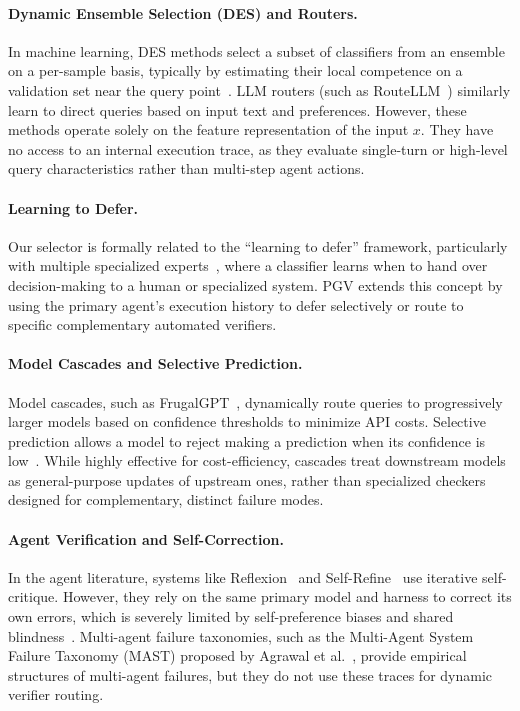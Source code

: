 \documentclass[manuscript,screen,nonacm]{acmart}
\begin{document}
\paragraph{Dynamic Ensemble Selection (DES) and Routers.}
In machine learning, DES methods select a subset of classifiers from an ensemble on a per-sample basis, typically by estimating their local competence on a validation set near the query point~\cite{cruz2018dynamic,ko2008dynamic,kuncheva2003measures}. LLM routers (such as RouteLLM~\cite{routellm2024}) similarly learn to direct queries based on input text and preferences. However, these methods operate solely on the feature representation of the input $x$. They have no access to an internal execution trace, as they evaluate single-turn or high-level query characteristics rather than multi-step agent actions.

\paragraph{Learning to Defer.}
Our selector is formally related to the ``learning to defer'' framework, particularly with multiple specialized experts~\cite{madras2018predict,verma2020learning}, where a classifier learns when to hand over decision-making to a human or specialized system. PGV extends this concept by using the primary agent's execution history to defer selectively or route to specific complementary automated verifiers.

\paragraph{Model Cascades and Selective Prediction.}
Model cascades, such as FrugalGPT~\cite{chen2023frugalgpt}, dynamically route queries to progressively larger models based on confidence thresholds to minimize API costs. Selective prediction allows a model to reject making a prediction when its confidence is low~\cite{chow1970optimum,geifman2017selective}. While highly effective for cost-efficiency, cascades treat downstream models as general-purpose updates of upstream ones, rather than specialized checkers designed for complementary, distinct failure modes.

\paragraph{Agent Verification and Self-Correction.}
In the agent literature, systems like Reflexion~\cite{shinn2023reflexion} and Self-Refine~\cite{madaan2023self} use iterative self-critique. However, they rely on the same primary model and harness to correct its own errors, which is severely limited by self-preference biases and shared blindness~\cite{saunders2022self}. Multi-agent failure taxonomies, such as the Multi-Agent System Failure Taxonomy (MAST) proposed by Agrawal et al.~\cite{agrawal2025why}, provide empirical structures of multi-agent failures, but they do not use these traces for dynamic verifier routing.
\end{document}
